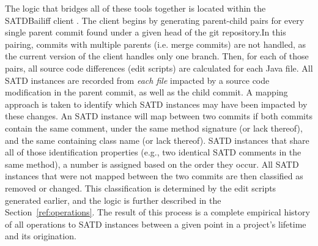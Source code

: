 \documentclass[3p]{elsarticle}
\newcommand{\approach}{SATDBailiff\xspace}
\newcommand*\circled[1]{\tikz[baseline=(char.base)]{
            \node[shape=circle,draw,inner sep=2pt] (char) {#1};}}
\begin{document}
The logic that bridges all of these tools together is located within the \approach client \circled{2}. The client begins by generating parent-child pairs for every single parent commit found under a given head of the git repository.In this pairing, commits with multiple parents (i.e. merge commits) are not handled, as the current version of the client handles only one branch. Then, for each of those pairs, all source code differences (edit scripts) are calculated for each Java file. All SATD instances are recorded from \textit{each file} impacted by a source code modification in the parent commit, as well as the child commit. A mapping approach is taken to identify which SATD instances may have been impacted by these changes. An SATD instance will map between two commits if both commits contain the same comment, under the same method signature (or lack thereof), and the same containing class name (or lack thereof). SATD instances that share all of those identification properties (e.g., two identical SATD comments in the same method), a number is assigned based on the order they occur. All SATD instances that were not mapped between the two commits are then classified as removed or changed. This classification is determined by the edit scripts generated earlier, and the logic is further described in the Section~\ref{ref:operations}. The result of this process is a complete empirical history of all operations to SATD instances between a given point in a project's lifetime and its origination.
\end{document}
